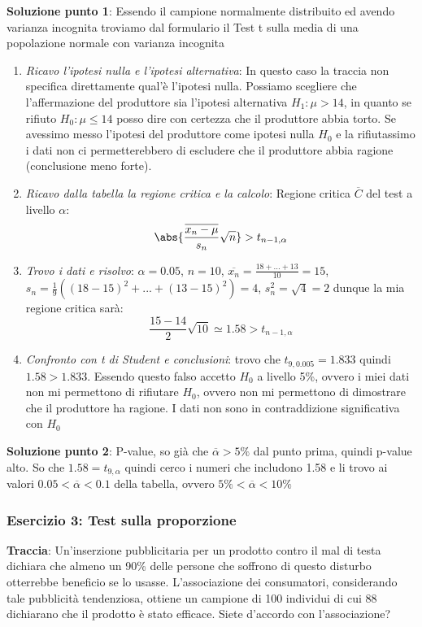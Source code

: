 \ind \textbf{Soluzione punto 1}: Essendo il campione normalmente distribuito ed avendo varianza incognita troviamo dal formulario il Test t sulla media di una popolazione normale con varianza incognita
\begin{enumerate}
    \item \textit{Ricavo l'ipotesi nulla e l'ipotesi alternativa}: In questo caso la traccia non specifica direttamente qual'è l'ipotesi nulla. Possiamo scegliere che l'affermazione del produttore sia l'ipotesi alternativa $H_1: \mu > 14$, in quanto se rifiuto $H_0: \mu \leq 14$ posso dire con certezza che il produttore abbia torto. Se avessimo messo l'ipotesi del produttore come ipotesi nulla $H_0$ e la rifiutassimo i dati non ci permetterebbero di escludere che il produttore abbia ragione (conclusione meno forte). 
    \item \textit{Ricavo dalla tabella la regione critica e la calcolo}: Regione critica $\overline{C}$ del test a livello $\alpha$: $$ \abs{ \dfrac{\overline{x_n - \mu }}{s_n} \sqrt{n}} > t_{n-1, \alpha}$$
    \item \textit{Trovo i dati e risolvo}: $\alpha = 0.05$, $n = 10$, $\overline{x_n}=\frac{18 + ... + 13}{10}=15$, $s_n = \frac{1}{9}((18-15)^2 + ... + (13 - 15)^2) = 4$, $s_n^2 = \sqrt{4}=2$ dunque la mia regione critica sarà: $$\dfrac{15-14}{2}\sqrt{10} \simeq 1.58 >  t_{n-1, \alpha}$$
    \item \textit{Confronto con t di Student e conclusioni}: trovo che $t_{9, 0.005}= 1.833$ quindi $1.58 > 1.833$. Essendo questo falso accetto $H_0$ a livello 5\%, ovvero i miei dati non mi permettono di rifiutare $H_0$, ovvero non mi permettono di dimostrare che il produttore ha ragione. I dati non sono in contraddizione significativa con $H_0$
\end{enumerate}

\ind \textbf{Soluzione punto 2}: P-value, so già che $\overline{\alpha} > 5\%$ dal punto prima, quindi p-value alto. So che $1.58 = t_{9, \alpha}$ quindi cerco i numeri che includono 1.58 e li trovo ai valori $0.05 < \overline{\alpha} < 0.1$ della tabella, ovvero $5\% < \overline{\alpha} < 10\%$ 

\subsubsection{Esercizio 3: Test sulla proporzione}

\ind \textbf{Traccia}: Un'inserzione pubblicitaria per un prodotto contro il mal di testa dichiara che almeno un 90\% delle persone che soffrono di questo disturbo otterrebbe beneficio se lo usasse. L'associazione dei consumatori, considerando tale pubblicità tendenziosa, ottiene un campione di 100 individui di cui 88 dichiarano che il prodotto è stato efficace. Siete d'accordo con l'associazione?

